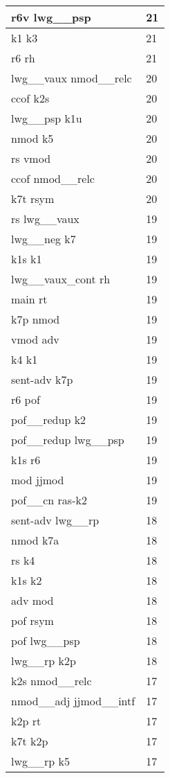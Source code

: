\documentclass[a4 paper]{article}
\begin{document}
\begin{longtable}{p{}p{}}
r6v lwg\_\_psp  & 21 \\ \midrule
k1 k3  & 21 \\ \midrule
r6 rh  & 21 \\ \midrule
lwg\_\_vaux nmod\_\_relc  & 20 \\ \midrule
ccof k2s  & 20 \\ \midrule
lwg\_\_psp k1u  & 20 \\ \midrule
nmod k5  & 20 \\ \midrule
rs vmod  & 20 \\ \midrule
ccof nmod\_\_relc  & 20 \\ \midrule
k7t rsym  & 20 \\ \midrule
rs lwg\_\_vaux  & 19 \\ \midrule
lwg\_\_neg k7  & 19 \\ \midrule
k1s k1  & 19 \\ \midrule
lwg\_\_vaux\_cont rh  & 19 \\ \midrule
main rt  & 19 \\ \midrule
k7p nmod  & 19 \\ \midrule
vmod adv  & 19 \\ \midrule
k4 k1  & 19 \\ \midrule
sent-adv k7p  & 19 \\ \midrule
r6 pof  & 19 \\ \midrule
pof\_\_redup k2  & 19 \\ \midrule
pof\_\_redup lwg\_\_psp  & 19 \\ \midrule
k1s r6  & 19 \\ \midrule
mod jjmod  & 19 \\ \midrule
pof\_\_cn ras-k2  & 19 \\ \midrule
sent-adv lwg\_\_rp  & 18 \\ \midrule
nmod k7a  & 18 \\ \midrule
rs k4  & 18 \\ \midrule
k1s k2  & 18 \\ \midrule
adv mod  & 18 \\ \midrule
pof rsym  & 18 \\ \midrule
pof lwg\_\_psp  & 18 \\ \midrule
lwg\_\_rp k2p  & 18 \\ \midrule
k2s nmod\_\_relc  & 17 \\ \midrule
nmod\_\_adj jjmod\_\_intf  & 17 \\ \midrule
k2p rt  & 17 \\ \midrule
k7t k2p  & 17 \\ \midrule
lwg\_\_rp k5  & 17 \\ \midrule

\end{longtable}
\end{document}
